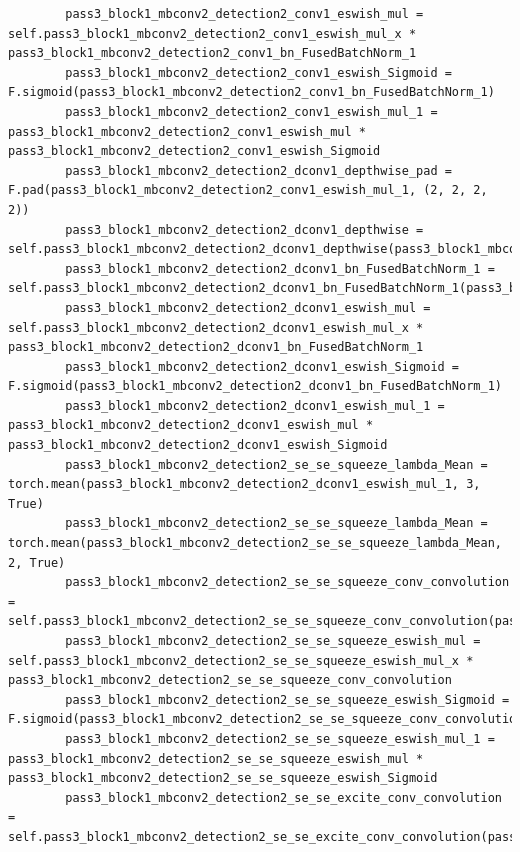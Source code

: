 \documentclass{fisatprojectfinal}
\begin{document}
\begin{appendices}
\begin{lstlisting}
        pass3_block1_mbconv2_detection2_conv1_eswish_mul = self.pass3_block1_mbconv2_detection2_conv1_eswish_mul_x * pass3_block1_mbconv2_detection2_conv1_bn_FusedBatchNorm_1
        pass3_block1_mbconv2_detection2_conv1_eswish_Sigmoid = F.sigmoid(pass3_block1_mbconv2_detection2_conv1_bn_FusedBatchNorm_1)
        pass3_block1_mbconv2_detection2_conv1_eswish_mul_1 = pass3_block1_mbconv2_detection2_conv1_eswish_mul * pass3_block1_mbconv2_detection2_conv1_eswish_Sigmoid
        pass3_block1_mbconv2_detection2_dconv1_depthwise_pad = F.pad(pass3_block1_mbconv2_detection2_conv1_eswish_mul_1, (2, 2, 2, 2))
        pass3_block1_mbconv2_detection2_dconv1_depthwise = self.pass3_block1_mbconv2_detection2_dconv1_depthwise(pass3_block1_mbconv2_detection2_dconv1_depthwise_pad)
        pass3_block1_mbconv2_detection2_dconv1_bn_FusedBatchNorm_1 = self.pass3_block1_mbconv2_detection2_dconv1_bn_FusedBatchNorm_1(pass3_block1_mbconv2_detection2_dconv1_depthwise)
        pass3_block1_mbconv2_detection2_dconv1_eswish_mul = self.pass3_block1_mbconv2_detection2_dconv1_eswish_mul_x * pass3_block1_mbconv2_detection2_dconv1_bn_FusedBatchNorm_1
        pass3_block1_mbconv2_detection2_dconv1_eswish_Sigmoid = F.sigmoid(pass3_block1_mbconv2_detection2_dconv1_bn_FusedBatchNorm_1)
        pass3_block1_mbconv2_detection2_dconv1_eswish_mul_1 = pass3_block1_mbconv2_detection2_dconv1_eswish_mul * pass3_block1_mbconv2_detection2_dconv1_eswish_Sigmoid
        pass3_block1_mbconv2_detection2_se_se_squeeze_lambda_Mean = torch.mean(pass3_block1_mbconv2_detection2_dconv1_eswish_mul_1, 3, True)
        pass3_block1_mbconv2_detection2_se_se_squeeze_lambda_Mean = torch.mean(pass3_block1_mbconv2_detection2_se_se_squeeze_lambda_Mean, 2, True)
        pass3_block1_mbconv2_detection2_se_se_squeeze_conv_convolution = self.pass3_block1_mbconv2_detection2_se_se_squeeze_conv_convolution(pass3_block1_mbconv2_detection2_se_se_squeeze_lambda_Mean)
        pass3_block1_mbconv2_detection2_se_se_squeeze_eswish_mul = self.pass3_block1_mbconv2_detection2_se_se_squeeze_eswish_mul_x * pass3_block1_mbconv2_detection2_se_se_squeeze_conv_convolution
        pass3_block1_mbconv2_detection2_se_se_squeeze_eswish_Sigmoid = F.sigmoid(pass3_block1_mbconv2_detection2_se_se_squeeze_conv_convolution)
        pass3_block1_mbconv2_detection2_se_se_squeeze_eswish_mul_1 = pass3_block1_mbconv2_detection2_se_se_squeeze_eswish_mul * pass3_block1_mbconv2_detection2_se_se_squeeze_eswish_Sigmoid
        pass3_block1_mbconv2_detection2_se_se_excite_conv_convolution = self.pass3_block1_mbconv2_detection2_se_se_excite_conv_convolution(pass3_block1_mbconv2_detection2_se_se_squeeze_eswish_mul_1)

\end{lstlisting}
\end{appendices}
\end{document}
